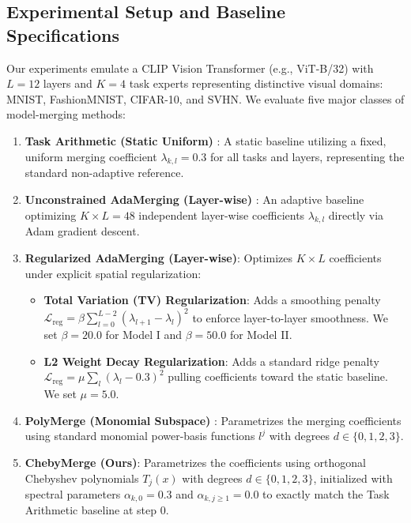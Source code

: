 \subsection{Experimental Setup and Baseline Specifications}
Our experiments emulate a CLIP Vision Transformer (e.g., ViT-B/32) with $L = 12$ layers and $K = 4$ task experts representing distinctive visual domains: MNIST, FashionMNIST, CIFAR-10, and SVHN. 
We evaluate five major classes of model-merging methods:
\begin{enumerate}
    \item \textbf{Task Arithmetic (Static Uniform)} \cite{ilharco2022editing}: A static baseline utilizing a fixed, uniform merging coefficient $\lambda_{k, l} = 0.3$ for all tasks and layers, representing the standard non-adaptive reference.
    \item \textbf{Unconstrained AdaMerging (Layer-wise)} \cite{lu2023adamerging}: An adaptive baseline optimizing $K \times L = 48$ independent layer-wise coefficients $\lambda_{k, l}$ directly via Adam gradient descent.
    \item \textbf{Regularized AdaMerging (Layer-wise)}: Optimizes $K \times L$ coefficients under explicit spatial regularization:
    \begin{itemize}
        \item \textbf{Total Variation (TV) Regularization}: Adds a smoothing penalty $\mathcal{L}_{\text{reg}} = \beta \sum_{l=0}^{L-2} (\lambda_{l+1} - \lambda_l)^2$ to enforce layer-to-layer smoothness. We set $\beta=20.0$ for Model I and $\beta=50.0$ for Model II.
        \item \textbf{L2 Weight Decay Regularization}: Adds a standard ridge penalty $\mathcal{L}_{\text{reg}} = \mu \sum_l (\lambda_l - 0.3)^2$ pulling coefficients toward the static baseline. We set $\mu = 5.0$.
    \end{itemize}
    \item \textbf{PolyMerge (Monomial Subspace)} \cite{polymerge2024}: Parametrizes the merging coefficients using standard monomial power-basis functions $l^j$ with degrees $d \in \{0, 1, 2, 3\}$.
    \item \textbf{ChebyMerge (Ours)}: Parametrizes the coefficients using orthogonal Chebyshev polynomials $T_j(x)$ with degrees $d \in \{0, 1, 2, 3\}$, initialized with spectral parameters $\alpha_{k, 0} = 0.3$ and $\alpha_{k, j \ge 1} = 0.0$ to exactly match the Task Arithmetic baseline at step 0.
\end{enumerate}

